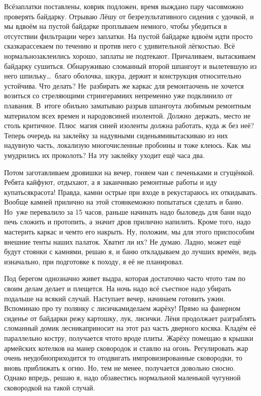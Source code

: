 Всё\mdash заплатки поставлены, коврик подложен, время выждано пару часов\mdash можно проверять байдарку. Отрываю Лёшу от безрезультативного сидения с удочкой, и мы вдвоём на пустой байдарке проплываем немного, чтобы убедиться в отсутствии фильтрации через заплатки. На пустой байдарке вдвоём идти просто сказка\mdash рассекаем по течению и против него с удивительной лёгкостью. Всё нормально\mdash заклеились хорошо, заплаты не подтекают. Причаливаем, вытаскиваем байдарку сушиться. Обнаруживаю сломанный второй шпангоут и вылетевшую из него шпильку\ldots~благо оболочка, шкура, держит и конструкция относительно устойчива. Что делать? Не~разбирать же каркас для ремонта\mdash очень не хочется возиться со стреляющими стрингерами\mdash их непременно уже подклинило от плавания. В~итоге обильно заматываю разрыв шпангоута любимым ремонтным материалом всех времен и народов\mdash синей изолентой. Должно~держать, место не столь критичное. Плюс~магия синей изоленты должна работать, куда ж без неё? Теперь очередь на заклейку за надувными сиденьями\mdash вытаскиваю из них надувную часть, локализую многочисленные пробоины и тоже клеюсь. Как~мы умудрились их проколоть? На эту заклейку уходит ещё часа два. 

Потом заготавливаем дровишки на вечер, гоняем чаи с печеньками и сгущёнкой. Ребята кайфуют, отдыхают, а я заканчиваю ремонтные работы и иду купаться\mdash красота! Правда, камни острые при входе в реку\mdash стараюсь их откидывать. Вообще камней прилично на этой стоянке\mdash можно попытаться сделать и баню. Но~уже перевалило за 15 часов, раньше начинать надо было\mdash ведь для бани надо печь сложить и протопить, а значит дров прилично напилить. Кроме того, надо мастерить каркас и чем\sdash то его накрыть. Ну, положим, мы для этого приспособим внешние тенты наших палаток. Хватит ли их? Не думаю. Ладно, может ещё будут стоянки с камнями, решаю я, и баню откладываем до лучших времён, ведь изначально, при подготовке к походу, я её не планировал.  

Под берегом однозначно живет выдра, которая достаточно часто что\sdash то там по своим делам делает и плещется. На ночь надо всё съестное надо убирать подальше на всякий случай. Наступает вечер, начинаем готовить ужин. Вспоминаю про ту полянку с лисичками\mdash делаем жарёху! Прямо на фанерном сиденье от байдарки режу картошку, лук, лисички. Лёня продолжает разграблять сломанный домик лесника\mdash приносит на этот раз часть дверного косяка. Кладём её параллельно костру, получается что\sdash то вроде плиты. Жарёху помещаю в крышки армейских котелков на манер сковородок и ставлю на огонь. Регулировать жар очень неудобно\mdash приходится то отодвигать импровизированные сковородки, то вновь приближать к огню. Но, тем не менее, получается довольно сносно. Однако впредь, решаю я, надо обзавестись нормальной маленькой чугунной сковородкой на такой случай. 

